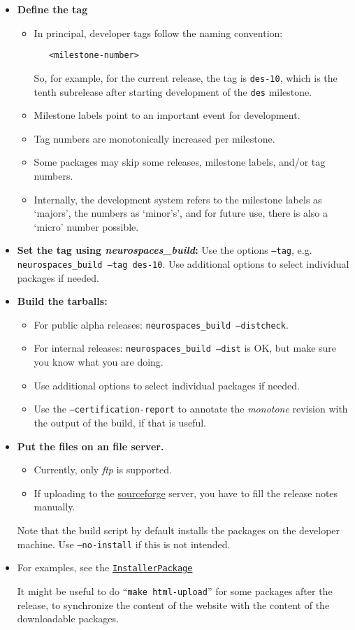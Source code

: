 \documentclass[12pt]{article}
\begin{document}
\begin{itemize}
\item {\bf Define the tag}
   \begin{itemize}
   \item In principal, developer tags follow the naming convention:
\begin{verbatim}
   <milestone-number>
\end{verbatim}   
   So, for example, for the current release, the tag is {\tt des-10}, which is the tenth subrelease after starting development of the {\tt des} milestone.
   \item Milestone labels point to an important event for development.
   \item Tag numbers are monotonically increased per milestone.
   \item Some packages may skip some releases, milestone labels, and/or tag numbers.
   \item Internally, the development system refers to the milestone labels as `majors', the numbers as `minor's', and for future use, there is also a `micro' number possible.
   \end{itemize}
   
\item {\bf Set the tag using {\it neurospaces\_build}:} Use the options {\tt --tag}, e.g. {\tt neurospaces\_build --tag des-10}. Use additional options to select individual packages if needed.
\item {\bf Build the tarballs:}
   \begin{itemize}
   \item For public alpha releases: {\tt neurospaces\_build --distcheck}.
   \item For internal releases: {\tt neurospaces\_build --dist} is OK, but make sure you know what you are doing.
   \item Use additional options to select individual packages if needed.
   \item Use the {\tt --certification-report} to annotate the {\it monotone} revision with the output of the build, if that is useful.
   \end{itemize}

\item {\bf Put the files on an file server.}
\begin{itemize}
   \item Currently, only {\it ftp} is supported.
   \item If uploading to the \href{http://sourceforge.net/projects/neurospaces/}{sourceforge} server, you have to fill the release notes manually. 
\end{itemize}
Note that the build script by default installs the packages on the developer machine. Use {\tt --no-install} if this is not intended.

\item For examples, see the \href{../installer-package/installer-package.tex}{\tt InstallerPackage} 

It might be useful to do ``{\tt make html-upload}'' for some packages after the release, to synchronize the content of the website with the content of the downloadable packages. 
\end{itemize}
\end{document}
